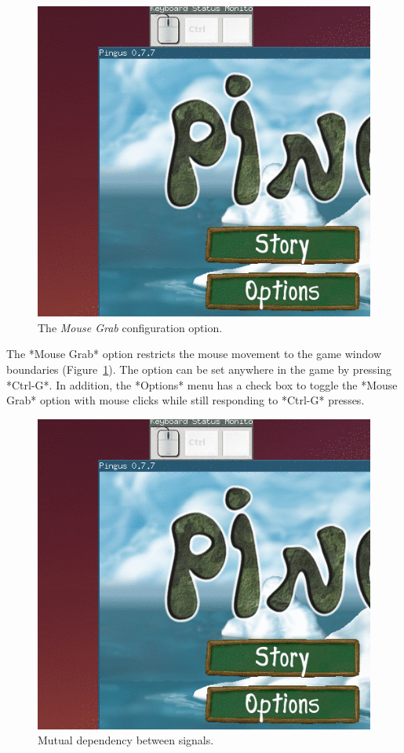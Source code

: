 \documentclass{vgtc}                          %
\begin{document}
\begin{figure}
\centering
\includegraphics[width=\columnwidth]{options-anim-opt}
\caption{The \emph{Mouse Grab} configuration option.
\label{fig.options}
}
\end{figure}

The *Mouse Grab* option restricts the mouse movement to the game window
boundaries (Figure~\ref{fig.options}).
The option can be set anywhere in the game by pressing *Ctrl-G*.
In addition, the *Options* menu has a check box to toggle the *Mouse Grab*
option with mouse clicks while still responding to *Ctrl-G* presses.

\begin{figure}
\centering
\includegraphics[width=\columnwidth]{options-anim-opt}
\caption{Mutual dependency between signals.
\label{fig.events}
}
\end{figure}
\end{document}
